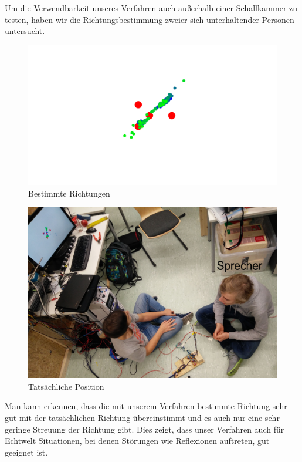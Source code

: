 Um die Verwendbarkeit unseres Verfahren auch außerhalb einer Schallkammer zu testen, haben wir die Richtungsbestimmung zweier sich unterhaltender Personen untersucht.
\begin{minipage}{0.49\linewidth}
  \begin{figure}[H]
    \centering
    \includegraphics[width=\textwidth]{img/real_real_data}
    \caption{Bestimmte Richtungen}
    \label{fig:real_real_data}
  \end{figure}
\end{minipage}\hfill
\begin{minipage}{0.49\linewidth}
  \begin{figure}[H]
    \centering
    \includegraphics[width=\textwidth]{img/real_real}
    \caption{Tatsächliche Position}
    \label{fig:real_real}
  \end{figure}
\end{minipage}

Man kann erkennen, dass die mit unserem Verfahren bestimmte Richtung sehr gut mit der tatsächlichen Richtung übereinstimmt und es auch nur eine sehr geringe Streuung der Richtung gibt. Dies zeigt, dass unser Verfahren auch für Echtwelt Situationen, bei denen Störungen wie Reflexionen auftreten, gut geeignet ist.